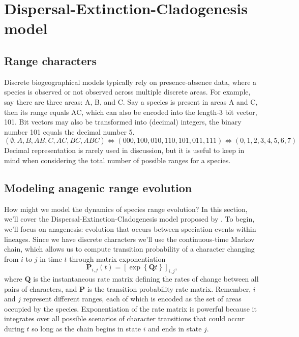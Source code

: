 \section{Dispersal-Extinction-Cladogenesis model}

\subsection{Range characters}

Discrete biogeographical models typically rely on presence-absence data, where a species is observed or not observed across multiple discrete areas.
For example, say there are three areas: A, B, and C.
Say a species is present in areas A and C, then its range equals AC, which can also be encoded into the length-3 bit vector, 101.
Bit vectors may also be transformed into (decimal) integers, \EG the binary number 101 equals the decimal number 5.
\[
( \emptyset, A, B, AB, C, AC, BC, ABC ) \Leftrightarrow (000,100,010,110,101,011,111) \Leftrightarrow ( 0, 1, 2, 3, 4, 5, 6, 7 )
\]
Decimal representation is rarely used in discussion, but it is useful to keep in mind when considering the total number of possible ranges for a species.

\subsection{Modeling anagenic range evolution}

How might we model the dynamics of species range evolution?
In this section, we'll cover the Dispersal-Extinction-Cladogenesis model proposed by \citet{Ree2005}.
To begin, we'll focus on anagenesis: evolution that occurs between speciation events within lineages.
Since we have discrete characters we'll use the continuous-time Markov chain, which allows us to compute transition probability of a character changing from $i$ to $j$ in time $t$ through matrix exponentiation
\[
\mathbf{P}_{i,j}(t) = \left[ \exp \left\lbrace \mathbf{Q}t \right\rbrace \right]_{i,j},
\]
where $\textbf{Q}$ is the instantaneous rate matrix defining the rates of change between all pairs of characters, and $\textbf{P}$ is the transition probability rate matrix.
Remember, $i$ and $j$ represent different ranges, each of which is encoded as the set of areas occupied by the species.
Exponentiation of the rate matrix is powerful because it integrates over all possible scenarios of character transitions that could occur during $t$ so long as the chain begins in state $i$ and ends in state $j$.

